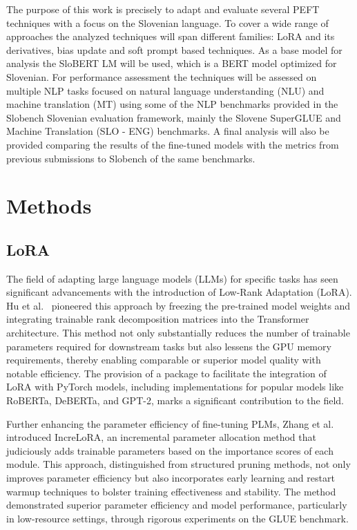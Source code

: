 \documentclass[fleqn,moreauthors,10pt]{ds_report}
\begin{document}
    The purpose of this work is precisely to adapt and evaluate several PEFT techniques with a focus on the Slovenian language. To cover a wide range of approaches the analyzed techniques will span different families: LoRA\cite{hu2022lora} and its derivatives, bias update\cite{bitfit} and soft prompt based techniques. As a base model for analysis the SloBERT LM will be used, which is a BERT model optimized for Slovenian. For performance assessment the techniques will be assessed on multiple NLP tasks focused on natural language understanding (NLU) and machine translation (MT) using some of the NLP benchmarks provided in the Slobench Slovenian evaluation framework, mainly the Slovene SuperGLUE and Machine Translation (SLO - ENG) benchmarks. A final analysis will also be provided comparing the results of the fine-tuned models with the metrics from previous submissions to Slobench of the same benchmarks. \\



\section*{Methods}

\subsection*{LoRA}

The field of adapting large language models (LLMs) for specific tasks has seen significant advancements with the introduction of Low-Rank Adaptation (LoRA). Hu et al.~\cite{hu2022lora} pioneered this approach by freezing the pre-trained model weights and integrating trainable rank decomposition matrices into the Transformer architecture. This method not only substantially reduces the number of trainable parameters required for downstream tasks but also lessens the GPU memory requirements, thereby enabling comparable or superior model quality with notable efficiency. The provision of a package to facilitate the integration of LoRA with PyTorch models, including implementations for popular models like RoBERTa, DeBERTa, and GPT-2, marks a significant contribution to the field.

Further enhancing the parameter efficiency of fine-tuning PLMs, Zhang et al.~\cite{zhang2023increlora} introduced IncreLoRA, an incremental parameter allocation method that judiciously adds trainable parameters based on the importance scores of each module. This approach, distinguished from structured pruning methods, not only improves parameter efficiency but also incorporates early learning and restart warmup techniques to bolster training effectiveness and stability. The method demonstrated superior parameter efficiency and model performance, particularly in low-resource settings, through rigorous experiments on the GLUE benchmark.
\end{document}
